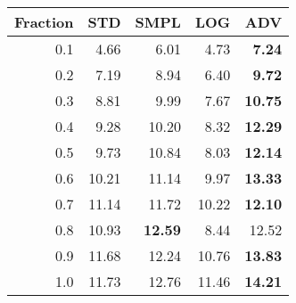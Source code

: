 \documentclass{standalone}
\begin{document}
\begin{tabular}{r|rrrr}
      \toprule
      Fraction & STD & SMPL & LOG & ADV\\
      \midrule
      0.1 & 4.66 & 6.01 & 4.73 & \textbf{7.24}\\
  0.2 & 7.19 & 8.94 & 6.40 & \textbf{9.72}\\
  0.3 & 8.81 & 9.99 & 7.67 & \textbf{10.75}\\
  0.4 & 9.28 & 10.20 & 8.32 & \textbf{12.29}\\
  0.5 & 9.73 & 10.84 & 8.03 & \textbf{12.14}\\
  0.6 & 10.21 & 11.14 & 9.97 & \textbf{13.33}\\
  0.7 & 11.14 & 11.72 & 10.22 & \textbf{12.10}\\
  0.8 & 10.93 & \textbf{12.59} & 8.44 & 12.52\\
  0.9 & 11.68 & 12.24 & 10.76 & \textbf{13.83}\\
  1.0 & 11.73 & 12.76 & 11.46 & \textbf{14.21}\\
  \bottomrule
\end{tabular}
\end{document}
